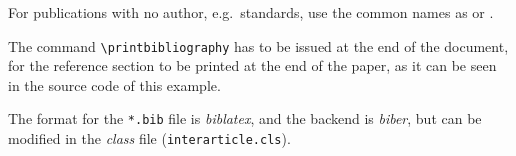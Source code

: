 \documentclass[unicode-math,microtype]{interarticle}
\newcommand\comm[1]{\texttt{\textbackslash #1}}
\begin{document}
For publications with no author, e.g.\ standards, use the common names as \citet{EN1995-1-1engl} or \citet{EN14080-2013}.\par

The command \comm{printbibliography} has to be issued at the end of the document, for the reference section to be printed at the end of the paper, as it can be seen in the source code of this example.\par

The format for the \texttt{*.bib} file is \emph{biblatex}, and the backend is \emph{biber}, but can be modified in the \emph{class} file (\texttt{interarticle.cls}).\par

\printbibliography[heading=bibnumbered]
\end{document}
